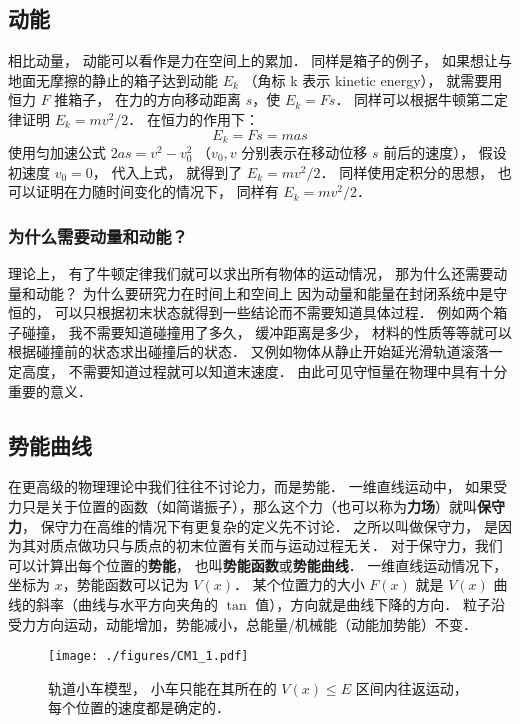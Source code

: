 \subsection{动能}
相比动量， 动能可以看作是力在空间上的累加． 同样是箱子的例子， 如果想让与地面无摩擦的静止的箱子达到动能 $E_k$ （角标 k 表示 kinetic energy）， 就需要用恒力 $F$ 推箱子， 在力的方向移动距离 $s$，使 $E_k = Fs$． 同样可以根据牛顿第二定律证明 $E_k = mv^2/2$． 在恒力的作用下：
\begin{equation}
E_k = Fs = mas
\end{equation}
使用匀加速公式 $2as = v^2 - v_0^2$ （$v_0, v$ 分别表示在移动位移 $s$ 前后的速度）， 假设初速度 $v_0 = 0$， 代入上式， 就得到了 $E_k = mv^2/2$． 同样使用定积分的思想， 也可以证明在力随时间变化的情况下， 同样有 $E_k = mv^2/2$．

\subsubsection{为什么需要动量和动能？}
理论上， 有了牛顿定律我们就可以求出所有物体的运动情况， 那为什么还需要动量和动能？ 为什么要研究力在时间上和空间上 因为动量和能量在封闭系统中是守恒的， 可以只根据初末状态就得到一些结论而不需要知道具体过程． 例如两个箱子碰撞， 我不需要知道碰撞用了多久， 缓冲距离是多少， 材料的性质等等就可以根据碰撞前的状态求出碰撞后的状态． 又例如物体从静止开始延光滑轨道滚落一定高度， 不需要知道过程就可以知道末速度． 由此可见守恒量在物理中具有十分重要的意义．

\subsection{势能曲线}
在更高级的物理理论中我们往往不讨论力，而是势能． 一维直线运动中， 如果受力只是关于位置的函数（如简谐振子），那么这个力（也可以称为\textbf{力场}）就叫\textbf{保守力}， 保守力在高维的情况下有更复杂的定义先不讨论． 之所以叫做保守力， 是因为其对质点做功只与质点的初末位置有关而与运动过程无关． 对于保守力，我们可以计算出每个位置的\textbf{势能}， 也叫\textbf{势能函数}或\textbf{势能曲线}． 一维直线运动情况下，坐标为 $x$，势能函数可以记为 $V(x)$． 某个位置力的大小 $F(x)$ 就是 $V(x)$ 曲线的斜率（曲线与水平方向夹角的 $\tan$ 值），方向就是曲线下降的方向． 粒子沿受力方向运动，动能增加，势能减小，总能量/机械能（动能加势能）不变．

\begin{figure}[ht]
\centering
\texttt{[image: ./figures/CM1\_1.pdf]}
\caption{轨道小车模型， 小车只能在其所在的 $V(x) \leqslant E$ 区间内往返运动， 每个位置的速度都是确定的．} \label{CM1_fig1}
\end{figure}


